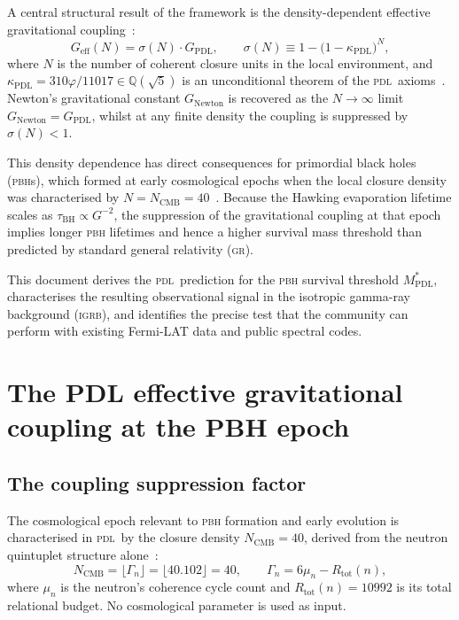 \documentclass[12pt, a4paper]{article}
\theoremstyle{definition}
\newcommand{\PDL}{\textsc{pdl}}
\newcommand{\Rtot}{R_{\mathrm{tot}}}
\newcommand{\Geff}{G_{\mathrm{eff}}}
\newcommand{\GPDL}{G_{\mathrm{PDL}}}
\newcommand{\sigN}{\sigma(N)}
\newcommand{\kappaPDL}{\kappa_{\mathrm{PDL}}}
\newcommand{\MstarPDL}{M^{*}_{\mathrm{PDL}}}
\newcommand{\NCMB}{N_{\mathrm{CMB}}}
\newcommand{\phigold}{\varphi}
\begin{document}
A central structural result of the framework is the density-dependent effective gravitational coupling~\cite{D24,D31,D36}:
\begin{equation}
  \Geff(N) = \sigN \cdot \GPDL, \qquad \sigN \equiv 1 - \bigl(1 - \kappaPDL\bigr)^{N},
  \label{eq:Geff}
\end{equation}
where $N$ is the number of coherent closure units in the local environment, and $\kappaPDL = 310\phigold/11017 \in \mathbb{Q}(\sqrt{5})$ is an unconditional theorem of the \PDL\ axioms~\cite{D39,D42}. Newton's gravitational constant $G_{\mathrm{Newton}}$ is recovered as the $N \to \infty$ limit $G_{\mathrm{Newton}} = \GPDL$, whilst at any finite density the coupling is suppressed by $\sigN < 1$.

This density dependence has direct consequences for primordial black holes (\textsc{pbh}s), which formed at early cosmological epochs when the local closure density was characterised by $N = \NCMB = 40$~\cite{D27,D35}. Because the Hawking evaporation lifetime scales as $\tau_{\mathrm{BH}} \propto G^{-2}$, the suppression of the gravitational coupling at that epoch implies longer \textsc{pbh} lifetimes and hence a higher survival mass threshold than predicted by standard general relativity (\textsc{gr}).

This document derives the \PDL\ prediction for the \textsc{pbh} survival threshold $\MstarPDL$, characterises the resulting observational signal in the isotropic gamma-ray background (\textsc{igrb}), and identifies the precise test that the community can perform with existing Fermi-LAT data and public spectral codes.

\section{The PDL effective gravitational coupling at the PBH epoch}

\subsection{The coupling suppression factor}

The cosmological epoch relevant to \textsc{pbh} formation and early evolution is characterised in \PDL\ by the closure density $\NCMB = 40$, derived from the neutron quintuplet structure alone~\cite{D27}:
\begin{equation}
  \NCMB = \lfloor \Gamma_n \rfloor = \lfloor 40.102 \rfloor = 40,
  \qquad \Gamma_n = 6\mu_n - \Rtot(n),
\end{equation}
where $\mu_n$ is the neutron's coherence cycle count and $\Rtot(n) = 10992$ is its total relational budget. No cosmological parameter is used as input.
\end{document}
